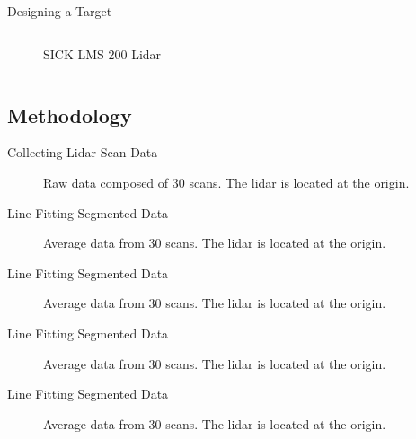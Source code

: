 \documentclass{beamer}
\begin{document}
\begin{frame}{Designing a Target}
\begin{columns}[T]
\begin{column}{.5\textwidth}
\begin{figure}
                \caption{SICK LMS 200 Lidar}
            \end{figure}
        \end{column}
  \end{columns} 
\end{frame}

\subsection{Methodology}
\begin{frame}{Collecting Lidar Scan Data}
    \begin{figure}
        \centering 
        
        \caption{Raw data composed of 30 scans. The lidar is located at the origin.}
    \end{figure}
\end{frame}

\begin{frame}{Line Fitting Segmented Data}
    \begin{figure}
        \centering 
        
        \caption{Average data from 30 scans. The lidar is located at the origin.}
    \end{figure}
\end{frame}

\begin{frame}{Line Fitting Segmented Data}
    \begin{figure}
        \centering 
        
        \caption{Average data from 30 scans. The lidar is located at the origin.}
    \end{figure}
\end{frame}

\begin{frame}{Line Fitting Segmented Data}
    \begin{figure}
        \centering 
        
        \caption{Average data from 30 scans. The lidar is located at the origin.}
    \end{figure}
\end{frame}

\begin{frame}{Line Fitting Segmented Data}
    \begin{figure}
        \centering 
        
        \caption{Average data from 30 scans. The lidar is located at the origin.}
    \end{figure}
\end{frame}
\end{document}

